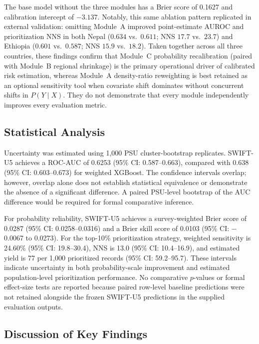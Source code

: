 \documentclass[a4paper,fleqn]{cas-sc}
\begin{document}
The base model without the three modules has a Brier score of 0.1627 and calibration intercept of $-3.137$. Notably, this same ablation pattern replicated in external validation: omitting Module~A improved point-estimate AUROC and prioritization NNS in both Nepal ($0.634$ vs.\ $0.611$; NNS $17.7$ vs.\ $23.7$) and Ethiopia ($0.601$ vs.\ $0.587$; NNS $15.9$ vs.\ $18.2$). Taken together across all three countries, these findings confirm that Module~C probability recalibration (paired with Module~B regional shrinkage) is the primary operational driver of calibrated risk estimation, whereas Module~A density-ratio reweighting is best retained as an optional sensitivity tool when covariate shift dominates without concurrent shifts in $P(Y \mid X)$. They do not demonstrate that every module independently improves every evaluation metric.

\subsection{Statistical Analysis}
\label{sec:res_statistical}

Uncertainty was estimated using 1,000 PSU cluster-bootstrap replicates. SWIFT-U5 achieves a ROC-AUC of 0.6253 (95\% CI: 0.587--0.663), compared with 0.638 (95\% CI: 0.603--0.673) for weighted XGBoost. The confidence intervals overlap; however, overlap alone does not establish statistical equivalence or demonstrate the absence of a significant difference. A paired PSU-level bootstrap of the AUC difference would be required for formal comparative inference.

For probability reliability, SWIFT-U5 achieves a survey-weighted Brier score of 0.0287 (95\% CI: 0.0258--0.0316) and a Brier skill score of 0.0103 (95\% CI: $-$0.0067 to 0.0273). For the top-10\% prioritization strategy, weighted sensitivity is 24.60\% (95\% CI: 19.8--30.4), NNS is 13.0 (95\% CI: 10.4--16.9), and estimated yield is 77 per 1,000 prioritized records (95\% CI: 59.2--95.7). These intervals indicate uncertainty in both probability-scale improvement and estimated population-level prioritization performance. No comparative $p$-values or formal effect-size tests are reported because paired row-level baseline predictions were not retained alongside the frozen SWIFT-U5 predictions in the supplied evaluation outputs.

\subsection{Discussion of Key Findings}
\label{sec:res_discussion}
\end{document}

